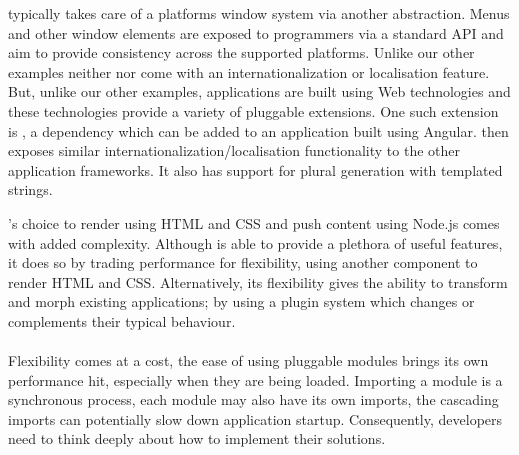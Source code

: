    typically takes care of a platforms window system via another abstraction. Menus\cite{electron_menu} and other window elements are exposed to programmers via a standard API and aim to provide consistency across the supported platforms.
  Unlike our other examples neither  nor  come with an internationalization or localisation feature. But, unlike our other examples,  applications are built using Web technologies and these technologies provide a variety of pluggable extensions. One such extension is , a dependency which can be added to an application built using Angular\cite{angular_translate}.  then exposes similar internationalization/localisation functionality to the other application frameworks. It also has support for plural generation with templated strings.

  's choice to render using HTML and CSS and push content using Node.js comes with added complexity. Although  is able to provide a plethora of useful features, it does so by trading performance for flexibility, using another component to render HTML and CSS. Alternatively, its flexibility gives the ability to transform and morph existing  applications; by using a plugin system which changes or complements their typical behaviour.\\\\
  Flexibility comes at a cost, the ease of using pluggable modules brings its own performance hit, especially when they are being loaded. Importing a module is a synchronous process, each module may also have its own imports, the cascading imports can potentially slow down application startup. Consequently, developers need to think deeply about how to implement their solutions.


